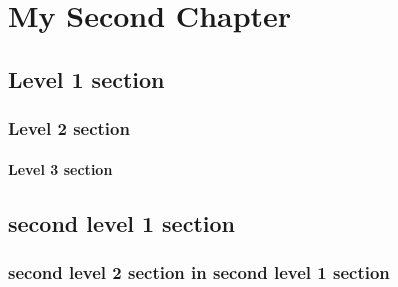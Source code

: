 \chapter{My Second Chapter}	%

\blindtext

\section{Level 1 section}
\blindtext

\subsection{Level 2 section}
\blindtext

\subsubsection{Level 3 section}
\blindtext[3]

\section{second level 1 section}
\blindtext

\subsection{second level 2 section in second level 1 section}
\blindtext

\endinput